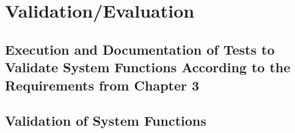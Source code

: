 \chapter{Validation/Evaluation}
\section{Execution and Documentation of Tests to Validate System Functions According to the Requirements from Chapter 3}
\section{Validation of System Functions}
